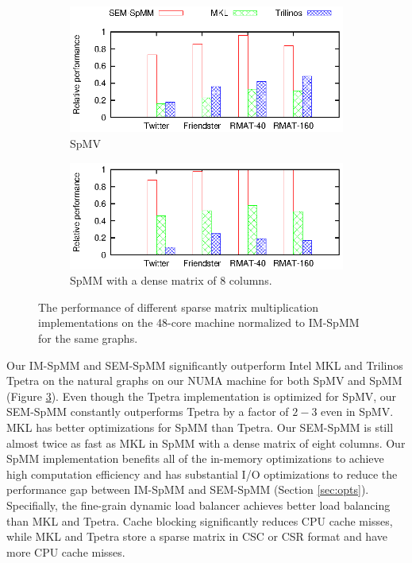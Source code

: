 \begin{figure}
	\footnotesize
	\centering
	\begin{subfigure}[b]{0.5\textwidth}
		\centering
		\includegraphics[scale=1]{SpMM_figs/SpMV-awesomer.eps}
		\vspace{-5pt}
		\caption{SpMV}
		\label{perf:spmv}
	\end{subfigure}
	\begin{subfigure}[b]{0.5\textwidth}
		\centering
		\includegraphics[scale=1]{SpMM_figs/SpMM-awesomer.eps}
		\vspace{-5pt}
		\caption{SpMM with a dense matrix of 8 columns.}
		\label{perf:spmm8}
	\end{subfigure}
	\vspace{3pt}
	\caption{The performance of different sparse matrix multiplication
		implementations on the 48-core machine normalized to IM-SpMM for
	the same graphs.}
	\label{perf:spmm}
\end{figure}

Our IM-SpMM and SEM-SpMM significantly outperform Intel MKL and
Trilinos Tpetra on the natural
graphs on our NUMA machine for both SpMV and SpMM (Figure \ref{perf:spmm}).
Even though the Tpetra implementation is optimized for SpMV, our SEM-SpMM
constantly outperforms Tpetra by a factor of $2-3$ even in SpMV. MKL has
better optimizations for SpMM than Tpetra. Our SEM-SpMM is still almost
twice as fast as MKL in SpMM with a dense matrix of eight columns. Our SpMM
implementation benefits all of the in-memory optimizations to achieve high
computation efficiency and has substantial I/O optimizations to reduce
the performance gap between IM-SpMM and SEM-SpMM (Section \ref{sec:opts}).
Specifially, the fine-grain dynamic load balancer achieves better load balancing
than MKL and Tpetra. Cache blocking significantly reduces CPU cache misses,
while MKL and Tpetra store a sparse matrix in CSC or CSR format and have
more CPU cache misses. %

